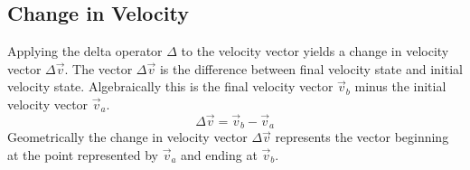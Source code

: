 \newpage


\subsection{Change in Velocity}

Applying the delta operator $\Delta$ to the velocity vector yields a change in velocity vector $\Delta \overrightarrow{v}$.  The vector $\Delta \overrightarrow{v}$ is the difference between final velocity state and initial velocity state.  Algebraically this is the final velocity vector $\overrightarrow{v}_b$ minus the initial velocity vector $\overrightarrow{v}_a$.   
$$\Delta \overrightarrow{v}=\overrightarrow{v}_b-\overrightarrow{v}_a$$
Geometrically the change in velocity vector $\Delta \overrightarrow{v}$ represents the vector beginning at the point represented by $\overrightarrow{v}_a$ and ending at $\overrightarrow{v}_b$.  
